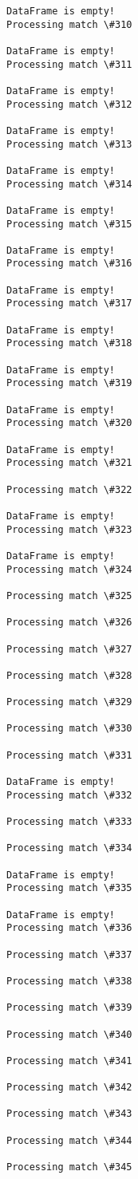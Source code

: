 \documentclass[11pt]{article}
\begin{document}
\begin{Verbatim}[commandchars=\\\{\}]
DataFrame is empty!
Processing match \#310

DataFrame is empty!
Processing match \#311

DataFrame is empty!
Processing match \#312

DataFrame is empty!
Processing match \#313

DataFrame is empty!
Processing match \#314

DataFrame is empty!
Processing match \#315

DataFrame is empty!
Processing match \#316

DataFrame is empty!
Processing match \#317

DataFrame is empty!
Processing match \#318

DataFrame is empty!
Processing match \#319

DataFrame is empty!
Processing match \#320

DataFrame is empty!
Processing match \#321

Processing match \#322

DataFrame is empty!
Processing match \#323

DataFrame is empty!
Processing match \#324

Processing match \#325

Processing match \#326

Processing match \#327

Processing match \#328

Processing match \#329

Processing match \#330

Processing match \#331

DataFrame is empty!
Processing match \#332

Processing match \#333

Processing match \#334

DataFrame is empty!
Processing match \#335

DataFrame is empty!
Processing match \#336

Processing match \#337

Processing match \#338

Processing match \#339

Processing match \#340

Processing match \#341

Processing match \#342

Processing match \#343

Processing match \#344

Processing match \#345


\end{Verbatim}
\end{document}
